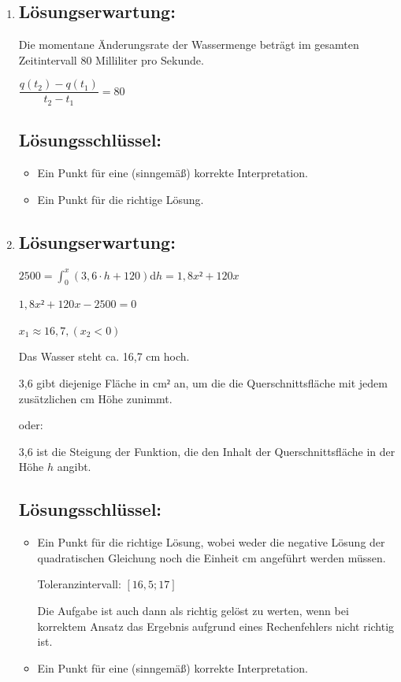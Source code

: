 \begin{langesbeispiel}
{\begin{enumerate}
	\item \subsection{Lösungserwartung:}
			
		Die momentane Änderungsrate der Wassermenge beträgt im gesamten Zeitintervall 80 Milliliter pro Sekunde.
		
		$\dfrac{q(t_2)-q(t_1)}{t_2-t_1}=80$

	\subsection{Lösungsschlüssel:}
	
\begin{itemize}
	\item Ein Punkt für eine (sinngemäß) korrekte Interpretation.
	\item Ein Punkt für die richtige Lösung.
\end{itemize}

\item \subsection{Lösungserwartung:}
	$2500=\int^x_0{(3,6\cdot h+120)}$d$h=1,8x²+120x$
	
	$1,8x²+120x-2500=0$
	
	$x_1\approx 16,7, (x_2<0)$
	
	Das Wasser steht ca. 16,7 cm hoch.
	
	3,6 gibt diejenige Fläche in cm$²$ an, um die die Querschnittsfläche mit jedem zusätzlichen cm Höhe zunimmt. 
	
	oder: 
	
	3,6 ist die Steigung der Funktion, die den Inhalt der Querschnittsfläche in der Höhe $h$ angibt.

	\subsection{Lösungsschlüssel:}
	
\begin{itemize}
	\item Ein Punkt für die richtige Lösung, wobei weder die negative Lösung der quadratischen Gleichung noch die Einheit cm angeführt werden müssen.
		
		Toleranzintervall: $[16,5; 17]$  
		
		Die Aufgabe ist auch dann als richtig gelöst zu werten, wenn bei korrektem Ansatz das Ergebnis aufgrund eines Rechenfehlers nicht richtig ist. 
	\item Ein Punkt für eine (sinngemäß) korrekte Interpretation.
\end{itemize}

\end{enumerate}}
		\end{langesbeispiel}